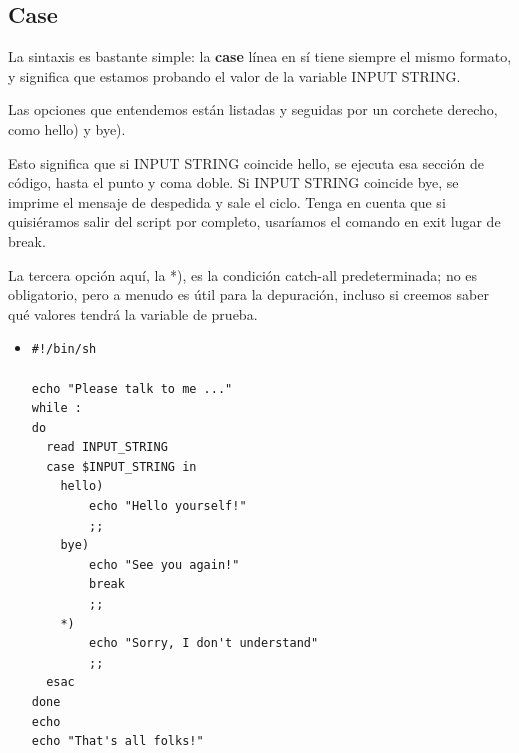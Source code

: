 \documentclass[12pt,letterpaper]{article}
\begin{document}
{        \subsection{Case}
        La sintaxis es bastante simple: la \textbf{case} línea en sí tiene siempre el mismo formato, y significa que estamos probando el valor de la variable INPUT STRING.\par
Las opciones que entendemos están listadas y seguidas por un corchete derecho, como hello) y bye).\par
Esto significa que si INPUT STRING coincide hello, se ejecuta esa sección de código, hasta el punto y coma doble. 
Si INPUT STRING coincide bye, se imprime el mensaje de despedida y sale el ciclo. Tenga en cuenta que si quisiéramos salir del script por completo, usaríamos el comando en exit lugar de break.\par
La tercera opción aquí, la *), es la condición catch-all predeterminada; no es obligatorio, pero a menudo es útil para la depuración, incluso si creemos saber qué valores tendrá la variable de prueba.
        \color{red}
        \begin{itemize}
        \item \begin{verbatim}
#!/bin/sh

echo "Please talk to me ..."
while :
do
  read INPUT_STRING
  case $INPUT_STRING in
	hello)
		echo "Hello yourself!"
		;;
	bye)
		echo "See you again!"
		break
		;;
	*)
		echo "Sorry, I don't understand"
		;;
  esac
done
echo 
echo "That's all folks!"
        \end{verbatim}
        \end{itemize}
        \color{black}
}
\end{document}
